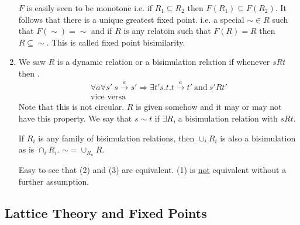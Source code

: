\documentclass[../598comp.tex]{subfiles}
\begin{document}
\begin{definition}
\begin{enumerate}
    $F$ is easily seen to be monotone i.e. if $R_1 \subseteq R_2$ then $F(R_1)
    \subseteq F(R_2)$. It follows that there is a unique greatest fixed point.
    i.e. a special $\sim \in R$ such that $F(\sim) = \sim$ and if $R$ is any
    relatoin such that $F(R) = R$ then $R \subseteq \sim$. This is called fixed
    point bisimilarity. 
  \item
    We saw $R$ is a dynamic relation or a bisimulation relation if whenever
    $sRt$ then .
    \begin{gather*}
      \forall a \forall s' \ s \overset{a}{\to} s' \Rightarrow \exists t' s.t. t
      \overset{a}{\to} t' \ \text{and} \ s'Rt' \\
      \text{vice versa}
    \end{gather*}
    Note that this is not circular. $R$ is given somehow and it may or may not
    have this property. We say that $s \sim t$ if $\exists R$, a bisimulation
    relation with $sRt$.
    \begin{fact}
      If $R_i$ is any family of bisimulation relations, then $\cup_iR_i$ is also
      a bisimulation as is $\cap_iR_i$. $\sim = \cup_{R_a}R$.
    \end{fact}
    Easy to see that (2) and (3) are equivalent. (1) is \ul{not} equivalent
    without a further assumption.
  \end{enumerate}
\end{definition}

\subsection{Lattice Theory and Fixed Points}
\end{document}
